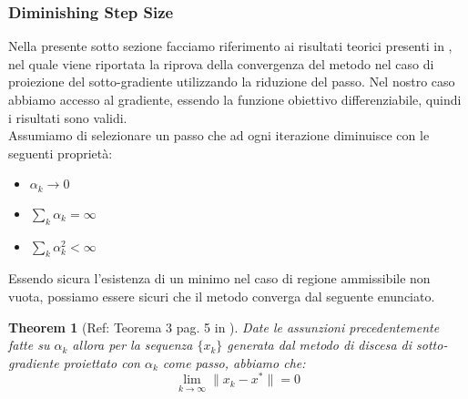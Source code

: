 \documentclass[12pt]{extarticle}
\newtheorem{theorem}{Theorem}[section]
\begin{document}
\subsubsection{Diminishing Step Size}
Nella presente sotto sezione facciamo riferimento ai risultati teorici presenti in \cite{sgd_notes}, nel quale viene riportata la riprova della convergenza del metodo nel caso di proiezione del sotto-gradiente utilizzando la riduzione del passo. Nel nostro caso abbiamo accesso al gradiente, essendo la funzione obiettivo differenziabile, quindi i risultati sono validi.\\
Assumiamo di selezionare un passo che ad ogni iterazione diminuisce con le seguenti proprietà:
\begin{itemize}
    \item $\alpha_k \to 0$
    \item $\sum_k \alpha_k = \infty$
    \item $\sum_k \alpha_k^2 < \infty$
\end{itemize}
Essendo sicura l'esistenza di un minimo nel caso di regione ammissibile non vuota, possiamo essere sicuri che il metodo converga dal seguente enunciato.
\begin{theorem}[Ref: Teorema 3 pag. 5 in \cite{sgd_notes}]
Date le assunzioni precedentemente fatte su $\alpha_k$ allora per la sequenza $\{x_k\}$ generata dal metodo di discesa di sotto-gradiente proiettato con $\alpha_k$ come passo, abbiamo che:
\[\lim_{k \to \infty} \| x_k - x^*\| = 0\]
\end{theorem}
\end{document}
